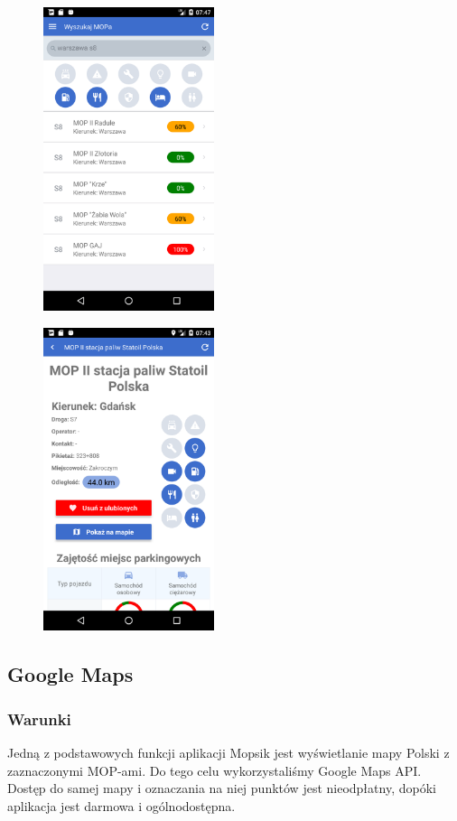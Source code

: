 \begin{figure}[!htb]
\centering
\begin{minipage}{.5\textwidth}
  \centering
  \includegraphics[width=5cm]{images/mopsik_mobile/search.png}
  \label{mopsik_search}
\end{minipage}%
\begin{minipage}{.5\textwidth}
  \centering
  \includegraphics[width=5cm]{images/mopsik_mobile/details.png}
  \label{mopsik_details}
\end{minipage}
\end{figure}


\subsection{Google Maps}
\subsubsection{Warunki}
Jedną z podstawowych funkcji aplikacji Mopsik jest wyświetlanie mapy Polski z zaznaczonymi MOP-ami. Do tego celu wykorzystaliśmy Google Maps API. Dostęp do samej mapy i oznaczania na niej punktów jest nieodpłatny, dopóki aplikacja jest darmowa i ogólnodostępna\cite{google-api-faq}.
